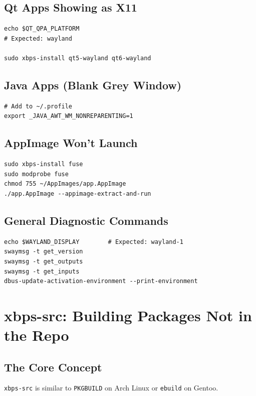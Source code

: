 \documentclass[12pt, a4paper]{book}
\begin{document}
\section{Qt Apps Showing as X11}
\begin{lstlisting}
echo $QT_QPA_PLATFORM
# Expected: wayland

sudo xbps-install qt5-wayland qt6-wayland
\end{lstlisting}

\section{Java Apps (Blank Grey Window)}
\begin{lstlisting}
# Add to ~/.profile
export _JAVA_AWT_WM_NONREPARENTING=1
\end{lstlisting}

\section{AppImage Won't Launch}
\begin{lstlisting}
sudo xbps-install fuse
sudo modprobe fuse
chmod 755 ~/AppImages/app.AppImage
./app.AppImage --appimage-extract-and-run
\end{lstlisting}

\section{General Diagnostic Commands}
\begin{lstlisting}
echo $WAYLAND_DISPLAY        # Expected: wayland-1
swaymsg -t get_version
swaymsg -t get_outputs
swaymsg -t get_inputs
dbus-update-activation-environment --print-environment
\end{lstlisting}

\chapter{xbps-src: Building Packages Not in the Repo}

\section{The Core Concept}

\texttt{xbps-src} is similar to \texttt{PKGBUILD} on Arch Linux or \texttt{ebuild} on Gentoo.
\end{document}
